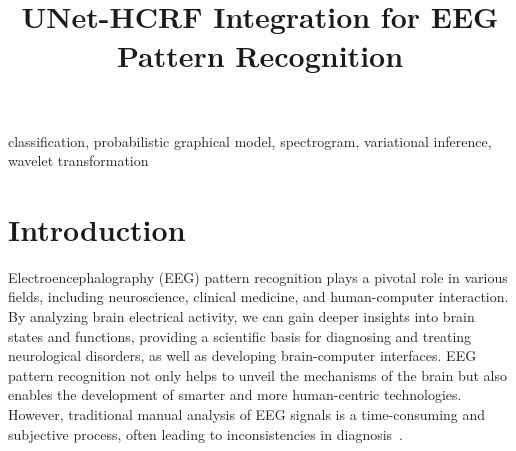 \documentclass[conference]{IEEEtran}
\begin{document}
\title{\huge UNet-HCRF Integration for EEG Pattern Recognition}

\author{
\and
{}
\and
{}
}

\maketitle


\begin{abstract}




\end{abstract}


\begin{IEEEkeywords}


classification, probabilistic graphical model, spectrogram,
variational inference, wavelet transformation


\end{IEEEkeywords}


\section{Introduction}


Electroencephalography (EEG) pattern recognition plays a pivotal role in
various fields, including neuroscience, clinical medicine, and human-computer
interaction. By analyzing brain electrical activity, we can gain deeper
insights into brain states and functions, providing a scientific basis for
diagnosing and treating neurological disorders, as well as developing
brain-computer interfaces. EEG pattern recognition not only helps to unveil the
mechanisms of the brain but also enables the development of smarter and more
human-centric technologies. However, traditional manual analysis of EEG signals
is a time-consuming and subjective process, often leading to inconsistencies in
diagnosis~\citep{liu2013recognizing}.
\end{document}
